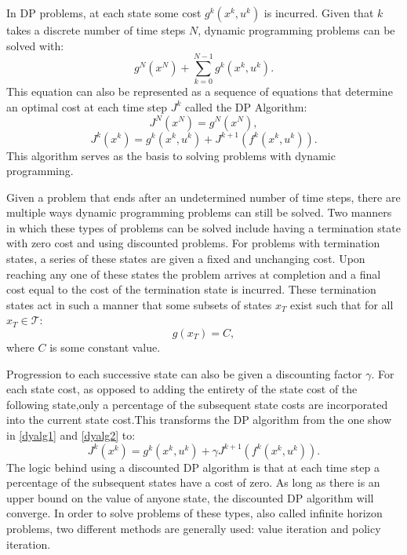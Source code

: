 In DP problems, at each state some cost $g^k(x^k,u^k)$ is incurred. Given that $k$ takes a discrete number of time steps $N$, dynamic programming problems can be solved with:
\begin{equation}\label{dyprog}
g^{N}(x^N)+\sum_{k=0}^{N-1}g^k(x^k,u^k).
\end{equation}
This equation can also be represented as a sequence of equations that determine an optimal cost at each time step $J^k$ called the DP Algorithm:
\begin{equation}\label{dyalg1}
J^N(x^N)= g^N(x^N),
\end{equation}
\begin{equation}\label{dyalg2}
J^k(x^k)= g^k(x^k,u^k)+J^{k+1}(f^k(x^k,u^k)).
\end{equation}
This algorithm serves as the basis to solving problems with dynamic programming.\cite{bert}

Given a problem that ends after an undetermined number of time steps, there are multiple ways dynamic programming problems can still be solved. Two manners in which these types of problems can be solved include having a termination state with zero cost and using discounted problems. For problems with termination states, a series of these states are given a fixed and unchanging cost. Upon reaching any one of these states the problem arrives at completion and a final cost equal to the cost of the termination state is incurred. These termination states act in such a manner that some subsets of states $x_T$ exist such that for all $x_T \in \mathscr{T}$:
\begin{equation}
g(x_T) = C,
\end{equation}
where $C$ is some constant value.

Progression to each successive state can also be given a discounting factor $\gamma$. For each state cost, as opposed to adding the entirety of the state cost of the following state,only a percentage of the subsequent state costs are incorporated into the current state cost.This transforms the DP algorithm from the one show in \ref{dyalg1} and \ref{dyalg2} to:
\begin{equation}\label{dyalgdis}
J^k(x^k)= g^k(x^k,u^k)+\gamma J^{k+1}(f^k(x^k,u^k)).
\end{equation}        
The logic behind using a discounted DP algorithm is that at each time step a percentage of the subsequent states have a cost of zero. As long as there is an upper bound on the value of anyone state, the discounted DP algorithm will converge. In order to solve problems of these types, also called infinite horizon problems, two different methods are generally used: value iteration and policy iteration.\cite{bert}  


